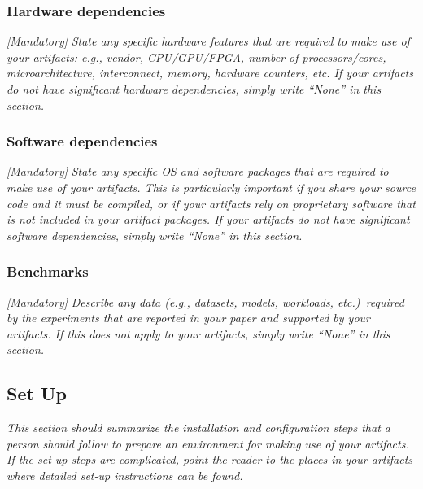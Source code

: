 
\subsubsection{Hardware dependencies}

\emph{[Mandatory]}
%
\emph{State any specific hardware features that are required to make
use of your artifacts: e.g., vendor, CPU/GPU/FPGA, number of
processors/cores, microarchitecture, interconnect, memory, hardware
counters, etc.  If your artifacts do not have significant hardware
dependencies, simply write ``None'' in this section.}


\subsubsection{Software dependencies}

\emph{[Mandatory]}
%
\emph{State any specific OS and software packages that are required to
make use of your artifacts.  This is particularly important if you
share your source code and it must be compiled, or if your artifacts
rely on proprietary software that is not included in your artifact
packages.  If your artifacts do not have significant software
dependencies, simply write ``None'' in this section.}


\subsubsection{Benchmarks}

\emph{[Mandatory]}
%
\emph{Describe any data (e.g., datasets, models, workloads,
etc.)\ required by the experiments that are reported in your paper and
supported by your artifacts.  If this does not apply to your
artifacts, simply write ``None'' in this section.}


\subsection{Set Up}

\emph{This section should summarize the installation and configuration
steps that a person should follow to prepare an environment for making
use of your artifacts.  If the set-up steps are complicated, point the
reader to the places in your artifacts where detailed set-up
instructions can be found.}

